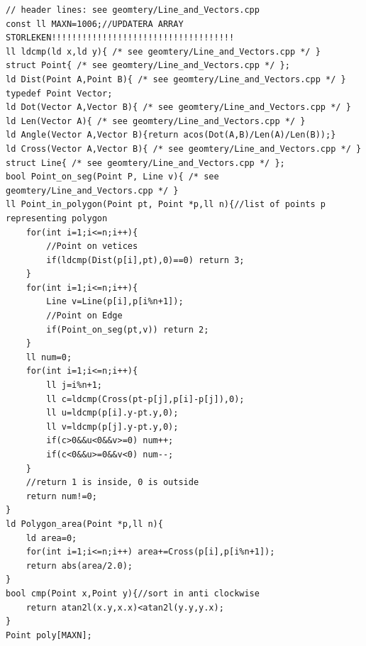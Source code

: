 \begin{lstlisting}[breaklines=true]
// header lines: see geomtery/Line_and_Vectors.cpp
const ll MAXN=1006;//UPDATERA ARRAY STORLEKEN!!!!!!!!!!!!!!!!!!!!!!!!!!!!!!!!!!!!
ll ldcmp(ld x,ld y){ /* see geomtery/Line_and_Vectors.cpp */ }
struct Point{ /* see geomtery/Line_and_Vectors.cpp */ };
ld Dist(Point A,Point B){ /* see geomtery/Line_and_Vectors.cpp */ }
typedef Point Vector;
ld Dot(Vector A,Vector B){ /* see geomtery/Line_and_Vectors.cpp */ }
ld Len(Vector A){ /* see geomtery/Line_and_Vectors.cpp */ }
ld Angle(Vector A,Vector B){return acos(Dot(A,B)/Len(A)/Len(B));}
ld Cross(Vector A,Vector B){ /* see geomtery/Line_and_Vectors.cpp */ }
struct Line{ /* see geomtery/Line_and_Vectors.cpp */ };
bool Point_on_seg(Point P, Line v){ /* see geomtery/Line_and_Vectors.cpp */ }
ll Point_in_polygon(Point pt, Point *p,ll n){//list of points p representing polygon
    for(int i=1;i<=n;i++){
        //Point on vetices
        if(ldcmp(Dist(p[i],pt),0)==0) return 3;
    }
    for(int i=1;i<=n;i++){
        Line v=Line(p[i],p[i%n+1]);
        //Point on Edge
        if(Point_on_seg(pt,v)) return 2;
    }
    ll num=0;
    for(int i=1;i<=n;i++){
        ll j=i%n+1;
        ll c=ldcmp(Cross(pt-p[j],p[i]-p[j]),0);
        ll u=ldcmp(p[i].y-pt.y,0);
        ll v=ldcmp(p[j].y-pt.y,0);
        if(c>0&&u<0&&v>=0) num++;
        if(c<0&&u>=0&&v<0) num--;
    }
    //return 1 is inside, 0 is outside
    return num!=0;
}
ld Polygon_area(Point *p,ll n){
    ld area=0;
    for(int i=1;i<=n;i++) area+=Cross(p[i],p[i%n+1]);
    return abs(area/2.0);
}
bool cmp(Point x,Point y){//sort in anti clockwise
    return atan2l(x.y,x.x)<atan2l(y.y,y.x);
}
Point poly[MAXN];
\end{lstlisting}


